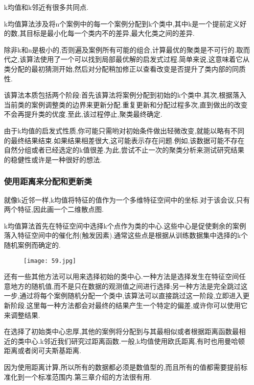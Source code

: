 \documentclass[11pt,a4paper,oneside]{book}
\begin{document}
k均值和k邻近有很多共同点.

k均值算法涉及将n个案例中的每一个案例分配到k个类中,其中k是一个提前定义好的数,其目标是最小化每一个类内不的差异,最大化类之间的差异.

除非k和n是极小的,否则遍及案例所有可能的组合,计算最优的聚类是不可行的.取而代之,该算法使用了一个可以找到局部最优解的启发式过程.简单来说,这意味着它从类分配的最初猜测开始,然后对分配稍加修正以查看改变是否提升了类内部的同质性.

该算法本质包括两个阶段:首先该算法将案例分配到初始的k个类中.其次,根据落入当前类的案例调整类的边界来更新分配.重复更新和分配过程多次,直到做出的改变不会再提升类的优度.至此,该过程停止,聚类最终确定.

\begin{tcolorbox}[colback=pink!10!white,colframe=pink!100!black]
由于k均值的启发式性质,你可能只需哟对初始条件做出轻微改变,就能以略有不同的最终结果结束.如果结果相差很大,这可能表示存在问题.例如,该数据可能不存在自然分组或者已经选定的k值很差.为此,尝试不止一次的聚类分析来测试研究结果的稳健性或许是一种很好的想法.
\end{tcolorbox}

\subsubsection{使用距离来分配和更新类}
就像k近邻一样,k均值将特征的值作为一个多维特征空间中的坐标.对于该会议,只有两个特征,因此画一个二维散点图.

k均值算法首先在特征空间中选择k个点作为类的中心.这些中心是促使剩余的案例落入特征空间中的催化剂(触发因素).通常这些点是根据从训练数据集中选择的k个随机案例而确定的.
\begin{figure}[H]
	\centering
	\texttt{[image: 59.jpg]}
\end{figure}

还有一些其他方法可以用来选择初始的类中心.一种方法是选择发生在特征空间任意地方的随机值,而不是只在数据的观测值之间进行选择;另一种方法是完全跳过这一步,通过将每个案例随机分配一个类中,该算法可以直接跳过这一阶段,立即进入更新阶段.这里每一种方法都会对最终的结果产生一个特定的偏差,或许你可以使用它来调整结果.

在选择了初始类中心忠厚,其他的案例将分配到与其最相似或者根据距离函数最相近的类中心.k邻近我们研究过距离函数.一般,k均值使用欧氏距离,有时也用曼哈顿距离或者闵可夫斯基距离.

\begin{tcolorbox}[colback=pink!10!white,colframe=pink!100!black]
因为使用距离计算,所以所有的数据都必须是数值型的,而且所有的值都需要提前标准化到一个标准范围内.第三章介绍的方法很有用.
\end{tcolorbox}
\end{document}
